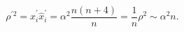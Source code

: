 \begin{equation}
\rho^{\prime 2}= 
\hat{x}_{i}^{\prime}\hat{x}_{i}^{\prime}
=\alpha^{2}\frac{n(n+4)}{n}=\frac{1}{n}\rho^{2}
\sim \alpha^{2}n .
\end{equation} 
